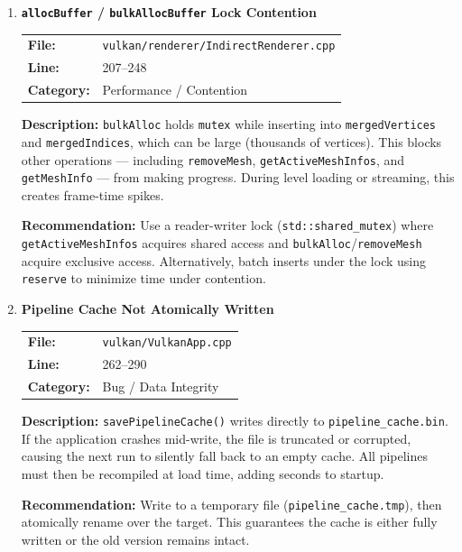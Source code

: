 \documentclass[a4paper,12pt]{article}
\newcommand{\severitybox}[2]{%
  \colorbox{#1}{\makebox[2.5cm][c]{\textcolor{white}{\textbf{#2}}}}%
}
\begin{document}
\begin{enumerate}[leftmargin=*]
\item[\textbf{[P10]}] \textbf{\texttt{allocBuffer} / \texttt{bulkAllocBuffer} Lock Contention}
  \hfill \severitybox{mediumcolor}{MEDIUM}

  \begin{tabular}{ll}
    \textbf{File:} & \texttt{vulkan/renderer/IndirectRenderer.cpp} \\
    \textbf{Line:} & 207--248 \\
    \textbf{Category:} & Performance / Contention \\
  \end{tabular}

  \textbf{Description:}
  \texttt{bulkAlloc} holds \texttt{mutex} while inserting into
  \texttt{mergedVertices} and \texttt{mergedIndices}, which can be large
  (thousands of vertices). This blocks other operations — including
  \texttt{removeMesh}, \texttt{getActiveMeshInfos}, and
  \texttt{getMeshInfo} — from making progress. During level loading or
  streaming, this creates frame-time spikes.

  \textbf{Recommendation:}
  Use a reader-writer lock (\texttt{std::shared\_mutex}) where
  \texttt{getActiveMeshInfos} acquires shared access and
  \texttt{bulkAlloc}/\texttt{removeMesh} acquire exclusive access.
  Alternatively, batch inserts under the lock using \texttt{reserve} to
  minimize time under contention.

\item[\textbf{[B11]}] \textbf{Pipeline Cache Not Atomically Written}
  \hfill \severitybox{mediumcolor}{MEDIUM}

  \begin{tabular}{ll}
    \textbf{File:} & \texttt{vulkan/VulkanApp.cpp} \\
    \textbf{Line:} & 262--290 \\
    \textbf{Category:} & Bug / Data Integrity \\
  \end{tabular}

  \textbf{Description:}
  \texttt{savePipelineCache()} writes directly to
  \texttt{pipeline\_cache.bin}. If the application crashes mid-write, the
  file is truncated or corrupted, causing the next run to silently fall back
  to an empty cache. All pipelines must then be recompiled at load time, adding
  seconds to startup.

  \textbf{Recommendation:}
  Write to a temporary file (\texttt{pipeline\_cache.tmp}), then atomically
  rename over the target. This guarantees the cache is either fully written
  or the old version remains intact.


\end{enumerate}
\end{document}
